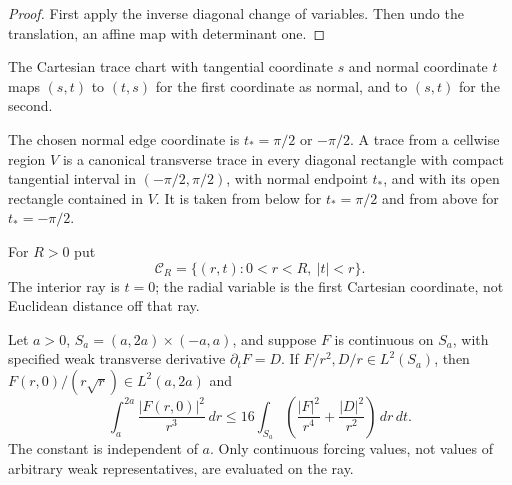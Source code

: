 \begin{proof}
\leanok
First apply the inverse diagonal change of variables. Then undo the
translation, an affine map with determinant one.
\end{proof}

\begin{definition}
\label{def:axis-trace-chart}
\leanok
The Cartesian trace chart with tangential coordinate $s$ and normal
coordinate $t$ maps $(s,t)$ to $(t,s)$ for the first coordinate as normal,
and to $(s,t)$ for the second.
\end{definition}

\begin{definition}
\label{def:cell-edge-trace}
\leanok
The chosen normal edge coordinate is $t_*=\pi/2$ or $-\pi/2$.
A trace from a cellwise region $V$ is a canonical transverse trace
in every diagonal rectangle with compact tangential interval in
$(-\pi/2,\pi/2)$, with normal endpoint $t_*$, and with its open rectangle
contained in $V$. It is taken from below for $t_*=\pi/2$ and from above
for $t_*=-\pi/2$.
\end{definition}

\begin{definition}
\label{def:cartesian-ray-cone}
\leanok
For $R>0$ put
\[
 \mathcal C_R=\{(r,t):0<r<R,\ |t|<r\}.
\]
The interior ray is $t=0$; the radial variable is the first Cartesian
coordinate, not Euclidean distance off that ray.
\end{definition}

\begin{lemma}
\label{lem:weighted-band-trace}
\leanok
Let $a>0$, $S_a=(a,2a)\times(-a,a)$, and suppose $F$ is continuous
on $S_a$, with specified weak transverse derivative $\partial_t F=D$.
If $F/r^2,D/r\in L^2(S_a)$, then
$F(r,0)/(r\sqrt r)\in L^2(a,2a)$ and
\[
 \int_a^{2a}\frac{|F(r,0)|^2}{r^3}\,dr
 \le16\int_{S_a}\left(\frac{|F|^2}{r^4}
                         +\frac{|D|^2}{r^2}\right)\,dr\,dt.
\]
The constant is independent of $a$. Only continuous forcing values,
not values of arbitrary weak representatives, are evaluated on the ray.
\end{lemma}

